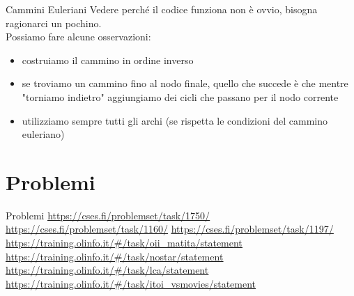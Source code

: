 \documentclass[compress]{beamer}
\begin{document}
\begin{frame}{Cammini Euleriani}
    Vedere perch\'e il codice funziona non è ovvio, bisogna ragionarci un pochino.\\
    \pause
    Possiamo fare alcune osservazioni:\\
    \begin{itemize}
        \item costruiamo il cammino in ordine inverso
        \pause
        \item se troviamo un cammino fino al nodo finale, quello che succede è che mentre "torniamo indietro" aggiungiamo 
        dei cicli che passano per il nodo corrente
        \pause
        \item utilizziamo sempre tutti gli archi (se rispetta le condizioni del cammino euleriano)
    \end{itemize}
    \pause
\end{frame}

\section{Problemi}
\begin{frame}{Problemi}
    \small{\underline{\url{https://cses.fi/problemset/task/1750/}}}
    \small{\underline{\url{https://cses.fi/problemset/task/1160/}}}
    \small{\underline{\url{https://cses.fi/problemset/task/1197/}}}
    \small{\underline{\url{https://training.olinfo.it/\#/task/oii_matita/statement}}}
    \small{\underline{\url{https://training.olinfo.it/\#/task/nostar/statement}}}
    \small{\underline{\url{https://training.olinfo.it/\#/task/lca/statement}}}
    \small{\underline{\url{https://training.olinfo.it/\#/task/itoi_vsmovies/statement}}}
\end{frame}
\end{document}
